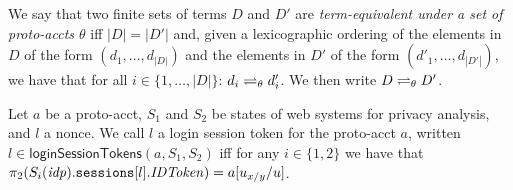 \begin{theorem}
\begin{definition}
    We say that two finite sets of terms $D$ and $D'$ are
    \emph{term-equivalent under a set of proto-accts $\theta$} 
    iff $|D| = |D'|$ and, given a lexicographic ordering of the 
    elements in $D$ of the form $(d_1,\dots,d_{|D|})$ and the 
    elements in $D'$ of the form $(d'_1,\dots,d_{|D'|})$, we 
    have that for all 
    $i \in \{1,\dots,|D|\}$: $d_i \rightleftharpoons_{\theta} d'_i$. 
    We then write $D \rightleftharpoons_{\theta} D'$.
  \end{definition}

  \begin{definition}
    Let $a$ be a proto-acct, $S_1$ and $S_2$ be states of \uppresso web systems for privacy analysis, and $l$ a nonce. 
    We call $l$ a login session token for the proto-acct $a$, written $l \in \mathsf{loginSessionTokens}(a,S_1,S_2)$ 
    iff for any $i \in \{1,2\}$ we have that $\pi_{2}({S_i(\mathit{idp}).\mathtt{sessions}[l].\mathit{IDToken}}) = a[u_{x/y}/u]$.
  \end{definition}
  

\end{theorem}
